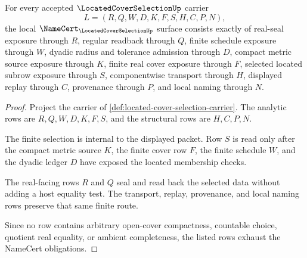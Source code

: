 \begin{theorem}
\label{thm:located-cover-selection-obligations}
For every accepted $\LocatedCoverSelectionUp$ carrier
$$
L=(R,Q,W,D,K,F,S,H,C,P,N),
$$
the local $\NameCert_{\LocatedCoverSelectionUp}$ surface consists exactly of real-seal exposure through $R$, regular readback through $Q$, finite schedule exposure through $W$, dyadic radius and tolerance admission through $D$, compact metric source exposure through $K$, finite real cover exposure through $F$, selected located subrow exposure through $S$, componentwise transport through $H$, displayed replay through $C$, provenance through $P$, and local naming through $N$.
\end{theorem}
\begin{proof}
Project the carrier of \autoref{def:located-cover-selection-carrier}. The analytic rows are $R,Q,W,D,K,F,S$, and the structural rows are $H,C,P,N$.

The finite selection is internal to the displayed packet. Row $S$ is read only after the compact metric source $K$, the finite cover row $F$, the finite schedule $W$, and the dyadic ledger $D$ have exposed the located membership checks.

The real-facing rows $R$ and $Q$ seal and read back the selected data without adding a host equality test. The transport, replay, provenance, and local naming rows preserve that same finite route.

Since no row contains arbitrary open-cover compactness, countable choice, quotient real equality, or ambient completeness, the listed rows exhaust the NameCert obligations.
\end{proof}

